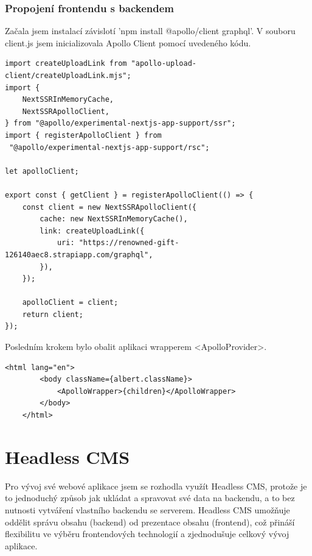 \documentclass[12pt, a4paper,
oneside,      %
openright
]{report}
\let\oldchapter\chapter
\renewcommand{\chapter}{
	\clearpage %
	\pagestyle{plain} %
	\oldchapter	
}
\begin{document}
\subsection{Propojení frontendu s backendem}
Začala jsem instalací závislotí 'npm install @apollo/client graphql'. V souboru client.js jsem inicializovala Apollo Client pomocí uvedeného kódu.

\vspace{10pt}

\begin{lstlisting}[style=JavaScript, title={Kód}, caption={Ukázka inicializace Apollo Clientu v client.js}] 
import createUploadLink from "apollo-upload-client/createUploadLink.mjs";
import {
	NextSSRInMemoryCache,
	NextSSRApolloClient,
} from "@apollo/experimental-nextjs-app-support/ssr";
import { registerApolloClient } from
 "@apollo/experimental-nextjs-app-support/rsc";

let apolloClient;

export const { getClient } = registerApolloClient(() => {
	const client = new NextSSRApolloClient({
		cache: new NextSSRInMemoryCache(),
		link: createUploadLink({
			uri: "https://renowned-gift-126140aec8.strapiapp.com/graphql",
		}),
	});
	
	apolloClient = client;
	return client;
});

\end{lstlisting}

\newpage
Posledním krokem bylo obalit aplikaci wrapperem <ApolloProvider>.

\vspace{10pt}

\begin{lstlisting}[style=JavaScript, title={Kód}, caption={Ukázka komponentu <ApolloProvider> v client.js}] 
	<html lang="en">
		<body className={albert.className}>
			<ApolloWrapper>{children}</ApolloWrapper>
		</body>
	</html>
\end{lstlisting}

\chapter{Headless CMS}
\label{sec:headlessCMS}
Pro vývoj své webové aplikace jsem se rozhodla využít Headless CMS, protože je to jednoduchý způsob jak ukládat a spravovat své data na backendu, a to bez nutnosti vytváření vlastního backendu se serverem. Headless CMS umožňuje oddělit správu obsahu (backend) od prezentace obsahu (frontend), což přináší flexibilitu ve výběru frontendových technologií a zjednodušuje celkový vývoj aplikace.
\end{document}
